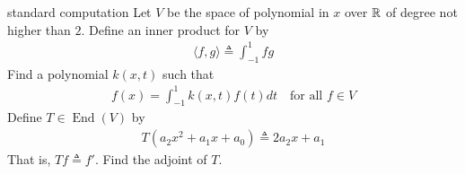 \documentclass{report}
\begin{document}
\begin{question}{standard computation}{}
Let $V$ be the space of polynomial in $x$ over  $\mathbb{R}$ of degree not higher than  $2$. Define an inner product for $V$ by 
\begin{align*}
\langle f,g\rangle \triangleq \int_{-1}^{1} fg
\end{align*}
Find a polynomial $k(x,t)$ such that 
\begin{align}
\label{fx=}
f(x)= \int_{-1}^{1}k(x,t)f(t)dt \quad\text{for all }f \in V
\end{align}
Define $T \in \operatorname{End}(V)$ by 
\begin{align*}
T(a_2x^2+a_1x+a_0) \triangleq 2a_2x+a_1
\end{align*}
That is, $Tf\triangleq f'$. Find the adjoint of $T$. 
\end{question}
\end{document}
